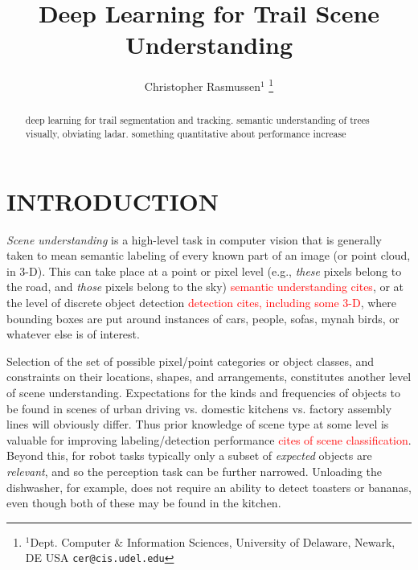 \documentclass[letterpaper, 10 pt, conference]{ieeeconf}  %
\title{\LARGE \bf
Deep Learning for Trail Scene Understanding
}
\author{Christopher Rasmussen$^{1}$%
\thanks{$^{1}$Dept. Computer \& Information Sciences,
        University of Delaware, Newark, DE USA
        {\tt\small cer@cis.udel.edu}}%
}
\newcommand{\comment}[1]{\textcolor{red}{#1}}
\begin{document}
\graphicspath{{images/}}

\maketitle
\thispagestyle{empty}
\pagestyle{empty}

\begin{abstract}

  deep learning for trail segmentation and tracking.  semantic understanding of trees
 visually, obviating ladar.  something quantitative about performance increase 
\end{abstract}



\section{INTRODUCTION}

\textit{Scene understanding} is a high-level task in computer vision
that is generally taken to mean semantic labeling of every known part of an
image (or point cloud, in 3-D).  This can take place at a point or pixel level (e.g., \textit{these}
pixels belong to the road, and \textit{those} pixels belong to the
sky) \comment{semantic understanding cites}, or at the level of
discrete object detection \comment{detection cites, including some 3-D}, where bounding
boxes are put around instances of cars, people, sofas, mynah birds, or
whatever else is of interest.

Selection of the set of possible pixel/point categories or object classes,
and constraints on their locations, shapes, and arrangements,
constitutes another level of scene understanding.  Expectations for
the kinds and frequencies of objects to be found in scenes of urban
driving vs. domestic kitchens vs. factory assembly lines will
obviously differ.  Thus prior knowledge of scene type at some level is
valuable for improving labeling/detection performance \comment{cites of scene classification}.  Beyond this,
for robot tasks typically only a subset of \textit{expected} objects
are \textit{relevant}, and so the perception task can be further
narrowed.  Unloading the dishwasher, for example, does not require an
ability to detect toasters or bananas, even though both of
these may be found in the kitchen.
\end{document}
